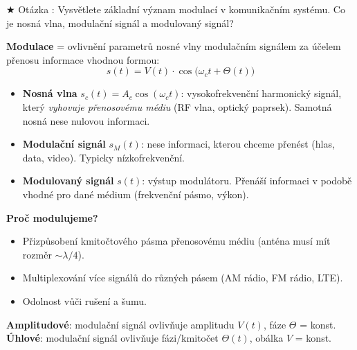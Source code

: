 \documentclass[12pt,a4paper]{article}
\newcounter{otcnt}
\newcommand{\QA}[2]{%
  \stepcounter{otcnt}%
  \begin{Otazka}{}%
    $\bigstar$ Otázka \theotcnt: #1%
  \end{Otazka}%
  \begin{Odpoved}%
    #2%
  \end{Odpoved}%
  \vspace{1em}%
}
\begin{document}
\QA{Vysvětlete základní význam modulací v komunikačním systému. Co je nosná vlna, modulační signál a modulovaný signál?}{%
  \textbf{Modulace} = ovlivnění parametrů nosné vlny modulačním signálem za účelem přenosu informace vhodnou formou:
  \[
    s(t) = V(t)\cdot\cos\!\bigl(\omega_c t + \Theta(t)\bigr)
  \]
  \begin{itemize}[itemsep=4pt]
    \item \textbf{Nosná vlna} $s_c(t) = A_c\cos(\omega_c t)$: vysokofrekvenční harmonický signál, který \textit{vyhovuje přenosovému médiu} (RF vlna, optický paprsek). Samotná nosná nese nulovou informaci.
    \item \textbf{Modulační signál} $s_M(t)$: nese informaci, kterou chceme přenést (hlas, data, video). Typicky nízkofrekvenční.
    \item \textbf{Modulovaný signál} $s(t)$: výstup modulátoru. Přenáší informaci v podobě vhodné pro dané médium (frekvenční pásmo, výkon).
  \end{itemize}
  \textbf{Proč modulujeme?}
  \begin{itemize}[itemsep=3pt]
    \item Přizpůsobení kmitočtového pásma přenosovému médiu (anténa musí mít rozměr $\sim\lambda/4$).
    \item Multiplexování více signálů do různých pásem (AM rádio, FM rádio, LTE).
    \item Odolnost vůči rušení a šumu.
  \end{itemize}
  \begin{Info}[Dělení modulací]
    \textbf{Amplitudové}: modulační signál ovlivňuje amplitudu $V(t)$, fáze $\Theta$ = konst.\\
    \textbf{Úhlové}: modulační signál ovlivňuje fázi/kmitočet $\Theta(t)$, obálka $V$ = konst.
  \end{Info}
}
\end{document}
